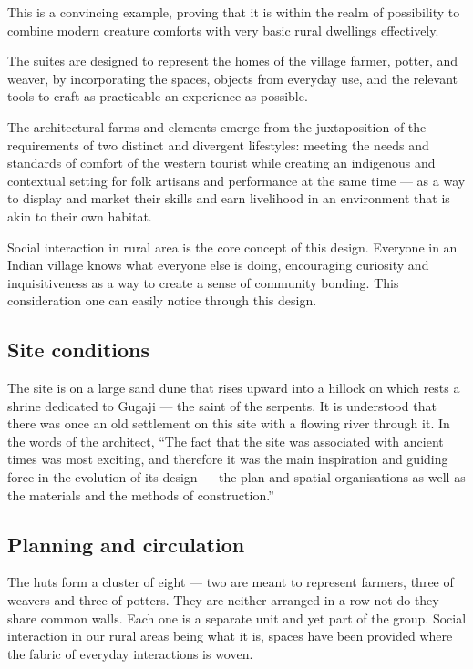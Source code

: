 This is a convincing example, proving that it is within the realm of possibility to combine modern creature comforts with very basic rural dwellings effectively.

The suites are designed to represent the homes of the village farmer, potter, and weaver, by incorporating the spaces, objects from everyday use, and the relevant tools to craft as practicable an experience as possible.

The architectural farms and elements emerge from the juxtaposition of the requirements of two distinct and divergent lifestyles: meeting the needs and standards of comfort of the western tourist while creating an indigenous and contextual setting for folk artisans and performance at the same time --- as a way to display and market their skills and earn livelihood in an environment that is akin to their own habitat.

Social interaction in rural area is the core concept of this design. Everyone in an Indian village knows what everyone else is doing, encouraging curiosity and inquisitiveness as a way to create a sense of community bonding. This consideration one can easily notice through this design.


\subsection{Site conditions} %
\label{sub:dcm_sitecond}

The site is on a large sand dune that rises upward into a hillock on which rests a shrine dedicated to Gugaji --- the saint of the serpents. It is understood that there was once an old settlement on this site with a flowing river through it. In the words of the architect, ``The fact that the site was associated with ancient times was most exciting, and therefore it was the main inspiration and guiding force in the evolution of its design --- the plan and spatial organisations as well as the materials and the methods of construction.''


\subsection{Planning and circulation} %
\label{sub:dcm_planning}

The huts form a cluster of eight --- two are meant to represent farmers, three of weavers and three of potters. They are neither arranged in a row not do they share common walls. Each one is a separate unit and yet part of the group. Social interaction in our rural areas being what it is, spaces have been provided where the fabric of everyday interactions is woven.


